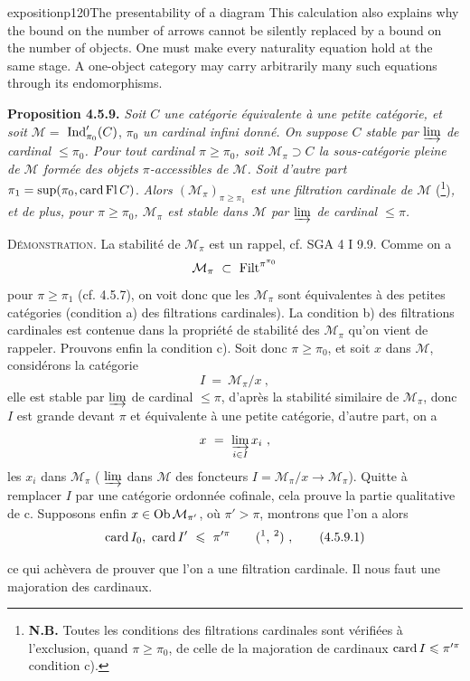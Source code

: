\begin{dcomment}{exposition}{p120}{The presentability of a diagram}
This calculation also explains why the bound on the number of arrows cannot be silently replaced by a bound on the number of objects. One must make every naturality equation hold at the same stage. A one-object category may carry arbitrarily many such equations through its endomorphisms.
\end{dcomment}


\textbf{Proposition 4.5.9.} \textit{Soit $C$ une catégorie équivalente à une petite catégorie, et soit $\mathcal{M} = $} $\operatorname{Ind}'_{\pi_0}(C)$, \textit{$\pi_0$ un cardinal infini donné. On suppose $C$ stable par $\varinjlim$ de cardinal $\leqslant \pi_0$. Pour tout cardinal $\pi \geqslant \pi_0$, soit $\mathcal{M}_\pi \supset C$ la sous-catégorie pleine de $\mathcal{M}$ formée des objets $\pi$-accessibles de $\mathcal{M}$. Soit d'autre part} $\pi_1 = \sup(\pi_0, \operatorname{card} \operatorname{Fl} C)$. \textit{Alors $(\mathcal{M}_\pi)_{\pi \geqslant \pi_1}$ est une filtration cardinale de $\mathcal{M}$} (\footnote{\textbf{N.B.} Toutes les conditions des filtrations cardinales sont vérifiées à l'exclusion, quand $\pi \geqslant \pi_0$, de celle de la majoration de cardinaux $\operatorname{card} I \leqslant \pi'^{\pi}$ condition c).})\textit{, et de plus, pour $\pi \geqslant \pi_0$, $\mathcal{M}_\pi$ est stable dans $\mathcal{M}$ par $\varinjlim$ de cardinal $\leqslant \pi$.}

\textsc{Démonstration.} La stabilité de $\mathcal{M}_\pi$ est un rappel, cf. SGA 4 I 9.9. Comme on a
\[
\mathcal{M}_\pi \ \subset \ \Filt^{\pi^{\pi_0}}
\]
pour $\pi \geqslant \pi_1$ (cf. 4.5.7), on voit donc que les $\mathcal{M}_\pi$ sont équivalentes à des petites catégories (condition a) des filtrations cardinales). La condition b) des filtrations cardinales est contenue dans la propriété de stabilité des $\mathcal{M}_\pi$ qu'on vient de rappeler. Prouvons enfin la condition c). Soit donc $\pi \geqslant \pi_0$, et soit $x$ dans $\mathcal{M}$, considérons la catégorie
\[
I \ = \ \mathcal{M}_\pi/x \ ,
\]
elle est stable par $\varinjlim$ de cardinal $\leqslant \pi$, d'après la stabilité similaire de $\mathcal{M}_\pi$, donc $I$ est grande devant $\pi$ et équivalente à une petite catégorie, d'autre part, on a
\[
x \ = \ \varinjlim_{i \in I} x_i \ ,
\]
les $x_i$ dans $\mathcal{M}_\pi$ ( $\varinjlim$ dans $\mathcal{M}$ des foncteurs $I = \mathcal{M}_\pi/x \longrightarrow \mathcal{M}_\pi$). Quitte à remplacer $I$ par une catégorie ordonnée cofinale, cela prouve la partie qualitative de c. Supposons enfin $x \in \mathrm{Ob}\, \mathcal{M}_{\pi'}$, où $\pi' > \pi$, montrons que l'on a alors
\[
\card I_0, \ \card I' \ \leqslant \ \pi'^{\pi} \qquad \text{(\footnotemark, \footnotemark)} \ , \tag*{(4.5.9.1)}
\]
\addtocounter{footnote}{-1}%
%
%
%
ce qui achèvera de prouver que l'on a une filtration cardinale. Il nous faut une majoration des cardinaux.

